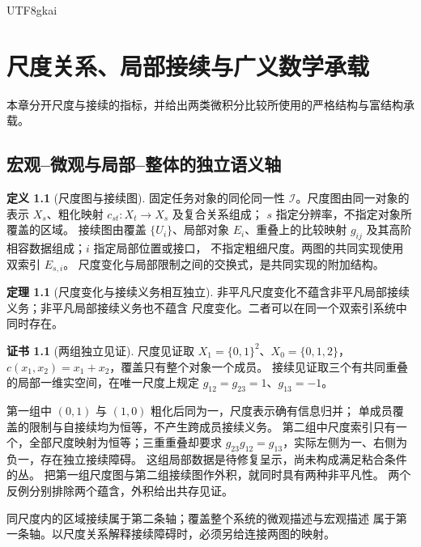 \documentclass[12pt]{report}
\makeatletter
\theoremstyle{definition}
\newtheorem{definition}{定义}[chapter]
\newtheorem{theorem}{定理}[chapter]
\newtheorem{Certificate}{证书}[chapter]
\renewenvironment{proof}[1][\proofname]{\par
  \pushQED{\qed}\normalfont
  \topsep6\p@\@plus6\p@\relax
  \trivlist
  \item[\hskip\labelsep\normalfont #1\@addpunct{.}]\ignorespaces
}{
  \popQED\endtrivlist\@endpefalse
}
\makeatother
\begin{document}
\begin{CJK*}{UTF8}{gkai}
\chapter{尺度关系、局部接续与广义数学承载}
\label{sec:axes-gms}
本章分开尺度与接续的指标，并给出两类微积分比较所使用的严格结构与富结构承载。

\section{宏观--微观与局部--整体的独立语义轴}
\begin{definition}[尺度图与接续图]
固定任务对象的同伦同一性 \(\mathcal I\)。尺度图由同一对象的表示
\(X_s\)、粗化映射 \(c_{st}:X_t\to X_s\) 及复合关系组成；
\(s\) 指定分辨率，不指定对象所覆盖的区域。
接续图由覆盖 \(\{U_i\}\)、局部对象 \(E_i\)、重叠上的比较映射
\(g_{ij}\) 及其高阶相容数据组成；\(i\) 指定局部位置或接口，
不指定粗细尺度。两图的共同实现使用双索引 \(E_{s,i}\)。
尺度变化与局部限制之间的交换式，是共同实现的附加结构。
\end{definition}
\begin{theorem}[尺度变化与接续义务相互独立]
\label{thm:axes-independent}
非平凡尺度变化不蕴含非平凡局部接续义务；非平凡局部接续义务也不蕴含
尺度变化。二者可以在同一个双索引系统中同时存在。
\end{theorem}
\begin{Certificate}[两组独立见证]
尺度见证取 \(X_1=\{0,1\}^2\)、\(X_0=\{0,1,2\}\)，
\(c(x_1,x_2)=x_1+x_2\)，覆盖只有整个对象一个成员。
接续见证取三个有共同重叠的局部一维实空间，在唯一尺度上规定
\(g_{12}=g_{23}=1\)、\(g_{13}=-1\)。
\end{Certificate}
\begin{proof}
第一组中 \((0,1)\) 与 \((1,0)\) 粗化后同为一，尺度表示确有信息归并；
单成员覆盖的限制与自接续均为恒等，不产生跨成员接续义务。
第二组中尺度索引只有一个，全部尺度映射为恒等；三重重叠却要求
\(g_{23}g_{12}=g_{13}\)，实际左侧为一、右侧为负一，存在独立接续障碍。
这组局部数据是待修复呈示，尚未构成满足粘合条件的丛。
把第一组尺度图与第二组接续图作外积，就同时具有两种非平凡性。
两个反例分别排除两个蕴含，外积给出共存见证。
\end{proof}
同尺度内的区域接续属于第二条轴；覆盖整个系统的微观描述与宏观描述
属于第一条轴。以尺度关系解释接续障碍时，必须另给连接两图的映射。


\end{CJK*}
\end{document}
